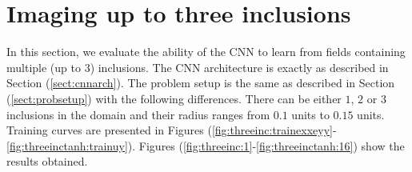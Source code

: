 \documentclass[12pt]{article}
\begin{document}
\section{\label{sect:threeinc}Imaging up to three inclusions}
In this section, we evaluate the ability of the CNN to learn from fields containing multiple (up to $3$) inclusions. The CNN architecture is exactly as described in Section (\ref{sect:cnnarch}). The problem setup is the same as described in Section (\ref{sect:probsetup}) with the following differences. There can be either $1$, $2$ or $3$ inclusions in the domain and their radius ranges from $0.1$ units to $0.15$ units. Training curves are presented in Figures (\ref{fig:threeinc:trainexxeyy}-\ref{fig:threeinctanh:trainuy}). Figures (\ref{fig:threeinc:1}-\ref{fig:threeinctanh:16}) show the results obtained. 
%
\end{document}

